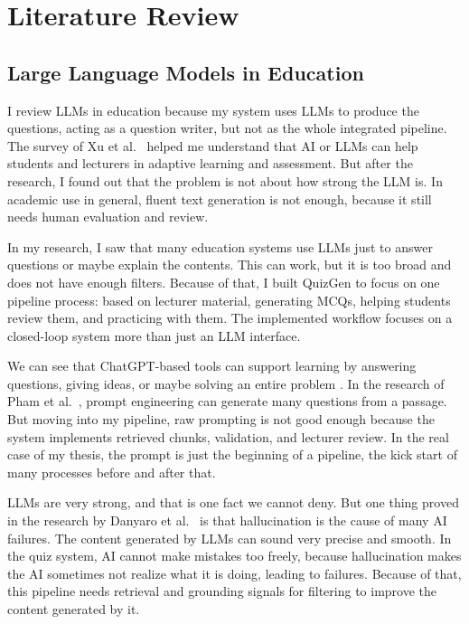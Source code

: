 \documentclass[12pt,a4paper]{article}
\begin{document}
\clearpage
\section{Literature Review}

\subsection{Large Language Models in Education}

I review LLMs in education because my system uses LLMs to produce the
questions, acting as a question writer, but not as the whole integrated
pipeline. The survey of Xu et al.\ \cite{xu2024survey1,xu2024survey2} helped
me understand that AI or LLMs can help students and lecturers in adaptive
learning and assessment. But after the research, I found out that the
problem is not about how strong the LLM is. In academic use in general,
fluent text generation is not enough, because it still needs human
evaluation and review.

In my research, I saw that many education systems use LLMs just to answer
questions or maybe explain the contents. This can work, but it is too broad
and does not have enough filters. Because of that, I built QuizGen to focus
on one pipeline process: based on lecturer material, generating MCQs, helping
students review them, and practicing with them. The implemented workflow
focuses on a closed-loop system more than just an LLM interface.

We can see that ChatGPT-based tools can support learning by answering
questions, giving ideas, or maybe solving an entire problem
\cite{frontiers2024chatgpt}. In the research of Pham et al.\
\cite{ieeebigdata2023}, prompt engineering can generate many questions from
a passage. But moving into my pipeline, raw prompting is not good enough
because the system implements retrieved chunks, validation, and lecturer
review. In the real case of my thesis, the prompt is just the beginning of a
pipeline, the kick start of many processes before and after that.

LLMs are very strong, and that is one fact we cannot deny. But one thing
proved in the research by Danyaro et al.\ \cite{danyaro2024hallucination} is
that hallucination is the cause of many AI failures. The content generated by
LLMs can sound very precise and smooth. In the quiz system, AI cannot make
mistakes too freely, because hallucination makes the AI sometimes not realize
what it is doing, leading to failures. Because of that, this pipeline needs
retrieval and grounding signals for filtering to improve the content
generated by it.
\end{document}
